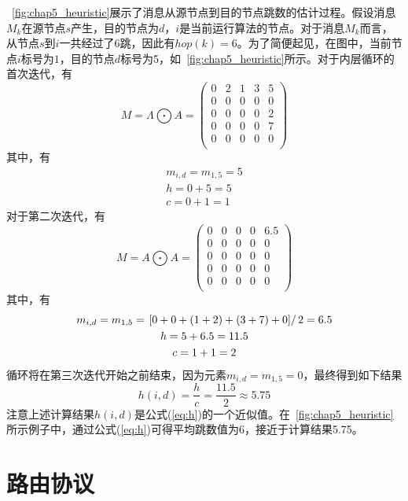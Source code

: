 \figurename~\ref{fig:chap5_heuristic}展示了消息从源节点到目的节点跳数的估计过程。假设消息$M_k$在源节点$s$产生，目的节点为$d$，$i$是当前运行算法的节点。对于消息$M_k$而言，从节点$s$到$i$一共经过了6跳，因此有$hop(k)=6$。为了简便起见，在图中，当前节点$i$标号为$1$，目的节点$d$标号为5，如\figurename~\ref{fig:chap5_heuristic}所示。对于内层循环的首次迭代，有
\begin{displaymath}
M=\Lambda\bigodot A=\left(
\begin{array}{ccccc}
 0 & 2 & 1 & 3 & 5 \\ 
 0 & 0 & 0 & 0 & 0 \\
 0 & 0 & 0 & 0 & 2 \\
 0 & 0 & 0 & 0 & 7 \\
 0 & 0 & 0 & 0 & 0 \\
\end{array}
\right)
\end{displaymath}
其中，有
\begin{gather*}
m_{i,d}=m_{1,5}=5 \\
h = 0+5 = 5 \\
c = 0+1 = 1  
\end{gather*}
对于第二次迭代，有
\begin{displaymath}
M=A\bigodot A = \left(
\begin{array}{ccccc}
 0 & 0 & 0 & 0 & 6.5 \\ 
 0 & 0 & 0 & 0 & 0 \\
 0 & 0 & 0 & 0 & 0 \\
 0 & 0 & 0 & 0 & 0 \\
 0 & 0 & 0 & 0 & 0 \\
\end{array}\right)
\end{displaymath}
其中，有
\begin{gather*}
m_{i,d}=m_{1,5}=\left.[0+0+(1+2)+(3+7)+0]\right/2=6.5 \\
h=5+6.5=11.5 \\
c=1+1=2 
\end{gather*}
循环将在第三次迭代开始之前结束，因为元素$m_{i,d}=m_{1,5}=0$，最终得到如下结果
\begin{displaymath}
h(i,d)=\frac{h}{c}=\frac{11.5}{2}\approx 5.75
\end{displaymath}
注意上述计算结果$h(i,d)$是公式(\ref{eq:h})的一个近似值。在\figurename~\ref{fig:chap5_heuristic}所示例子中，通过公式(\ref{eq:h})可得平均跳数值为6，接近于计算结果5.75。


\section{路由协议}
\label{chap5:路由协议}

